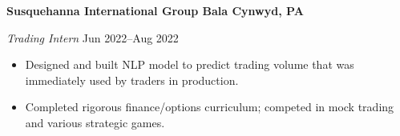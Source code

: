 \textbf{Susquehanna International Group \hfill Bala Cynwyd, PA}\par

\textit{Trading Intern} \hfill Jun 2022--Aug 2022
\begin{itemize}
	\item Designed and built NLP model to predict trading volume that was immediately used by traders in production.
	\item Completed rigorous finance/options curriculum; competed in mock trading and various strategic games.
\end{itemize} \par
